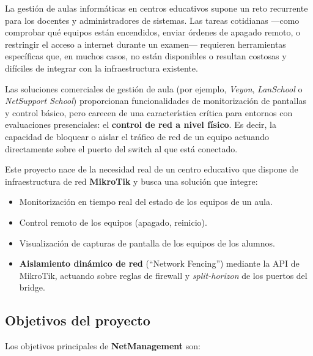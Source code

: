 \documentclass[12pt, a4paper, twoside]{article}
\begin{document}
La gestión de aulas informáticas en centros educativos supone un reto recurrente para los docentes y administradores de sistemas. Las tareas cotidianas —como comprobar qué equipos están encendidos, enviar órdenes de apagado remoto, o restringir el acceso a internet durante un examen— requieren herramientas específicas que, en muchos casos, no están disponibles o resultan costosas y difíciles de integrar con la infraestructura existente.

Las soluciones comerciales de gestión de aula (por ejemplo, \textit{Veyon}, \textit{LanSchool} o \textit{NetSupport School}) proporcionan funcionalidades de monitorización de pantallas y control básico, pero carecen de una característica crítica para entornos con evaluaciones presenciales: el \textbf{control de red a nivel físico}. Es decir, la capacidad de bloquear o aislar el tráfico de red de un equipo actuando directamente sobre el puerto del switch al que está conectado.

Este proyecto nace de la necesidad real de un centro educativo que dispone de infraestructura de red \textbf{MikroTik} y busca una solución que integre:

\begin{itemize}
  \item Monitorización en tiempo real del estado de los equipos de un aula.
  \item Control remoto de los equipos (apagado, reinicio).
  \item Visualización de capturas de pantalla de los equipos de los alumnos.
  \item \textbf{Aislamiento dinámico de red} (``Network Fencing'') mediante la API de MikroTik, actuando sobre reglas de firewall y \textit{split-horizon} de los puertos del bridge.
\end{itemize}

\subsection{Objetivos del proyecto}

Los objetivos principales de \textbf{NetManagement} son:
\end{document}
